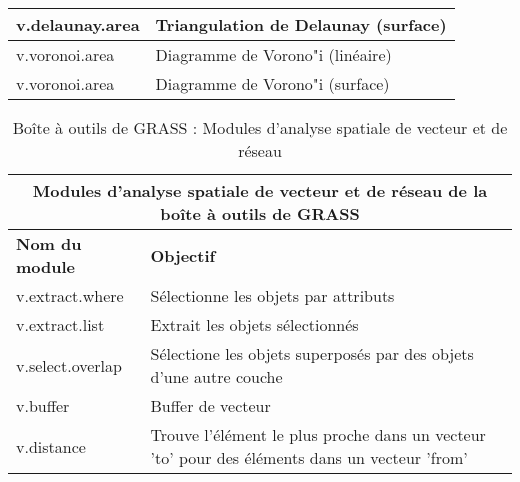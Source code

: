 \begin{table}[ht]
\begin{tabular}{|p{4cm}|p{12cm}|}
  \hline v.delaunay.area & Triangulation de Delaunay (surface) \\
  \hline v.voronoi.area & Diagramme de Vorono"i (lin\'eaire) \\
  \hline v.voronoi.area & Diagramme de Vorono"i (surface) \\
\hline
\end{tabular}
\end{table}

\begin{table}[ht]
\centering
\caption{Bo\^ite \`a outils de GRASS : Modules d'analyse spatiale de vecteur et de r\'eseau}\medskip
 \begin{tabular}{|p{4cm}|p{12cm}|}
  \hline \multicolumn{2}{|c|}{\textbf{Modules d'analyse spatiale de vecteur et de r\'eseau de la bo\^ite \`a outils de GRASS}} \\
  \hline \textbf{Nom du module} & \textbf{Objectif} \\
  \hline v.extract.where & S\'electionne les objets par attributs\\
  \hline v.extract.list & Extrait les objets s\'electionn\'es\\
  \hline v.select.overlap & S\'electione les objets superpos\'es par des objets d'une autre couche\\
  \hline v.buffer & Buffer de vecteur\\
  \hline v.distance & Trouve l'\'el\'ement le plus proche dans un vecteur 'to' pour des \'el\'ements dans un vecteur 'from'\\

\end{tabular}
\end{table}
